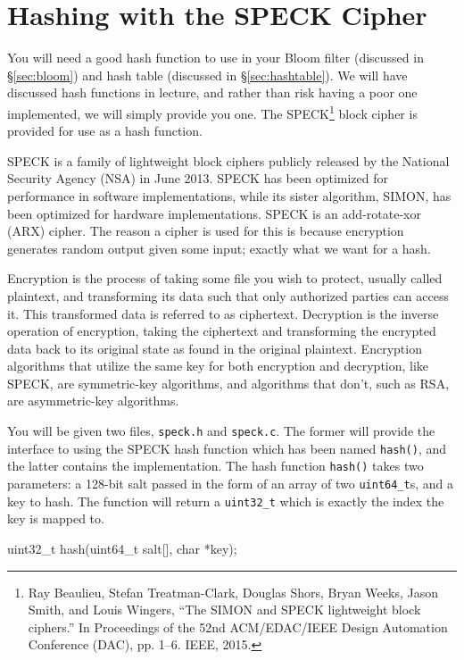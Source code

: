 \section{Hashing with the SPECK Cipher}\label{sec:speck}

\noindent You will need a good hash function to use in your Bloom filter
(discussed in \S\ref{sec:bloom}) and hash table (discussed in
\S\ref{sec:hashtable}). We will have discussed hash functions in lecture, and
rather than risk having a poor one implemented, we will simply provide you one.
The SPECK\footnote{ Ray Beaulieu, Stefan Treatman-Clark, Douglas Shors, Bryan
Weeks, Jason Smith, and Louis Wingers, ``The {SIMON} and {SPECK} lightweight
block ciphers.'' In Proceedings of the 52nd ACM/EDAC/IEEE Design Automation
Conference (DAC), pp.  1--6. IEEE, 2015.} block cipher is provided for use as a
hash function.

SPECK is a family of lightweight block ciphers publicly released by the
National Security Agency (NSA) in June 2013.  SPECK has been optimized
for performance in software implementations, while its sister algorithm,
SIMON, has been optimized for hardware implementations. SPECK is an
add-rotate-xor (ARX) cipher. The reason a cipher is used for this is
because encryption generates random output given some input; exactly
what we want for a hash.

Encryption is the process of taking some file you wish to protect,
usually called plaintext, and transforming its data such that only
authorized parties can access it. This transformed data is referred to
as ciphertext. Decryption is the inverse operation of encryption, taking
the ciphertext and transforming the encrypted data back to its original
state as found in the original plaintext. Encryption algorithms that
utilize the same key for both encryption and decryption, like SPECK, are
symmetric-key algorithms, and algorithms that don't, such as RSA, are
asymmetric-key algorithms.

You will be given two files, \texttt{speck.h} and \texttt{speck.c}. The
former will provide the interface to using the SPECK hash function which
has been named \texttt{hash()}, and the latter contains the
implementation. The hash function \texttt{hash()} takes two parameters:
a 128-bit salt passed in the form of an array of two
\texttt{uint64\_t}s, and a key to hash. The function will return a
\texttt{uint32\_t} which is exactly the index the key is mapped to.

\begin{clisting}{}
uint32_t hash(uint64_t salt[], char *key);
\end{clisting}

